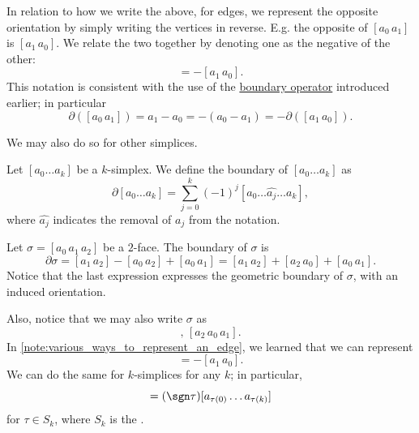 \documentclass[notoc,notitlepage]{tufte-book}
\begin{document}
\begin{note}\label{note:various_ways_to_represent_an_edge}
  In relation to how we write the above, for edges, we represent the opposite
  orientation by simply writing the vertices in reverse. E.g. the opposite of
  $[a_0 \, a_1]$ is $[a_1 \, a_0]$. We relate the two together by denoting one as
  the negative of the other:
  \begin{equation*}
    [a_0 \, a_1] = - [a_1 \, a_0].
  \end{equation*}
  This notation is consistent with the use of the
  \hyperref[defn:boundary_of_an_edge]{boundary operator} introduced earlier; in
  particular
  \begin{equation*}
    \partial ([a_0 \, a_1]) = a_1 - a_0 = - (a_0 - a_1) = - \partial ([a_1 \,
    a_0]).
  \end{equation*}
\end{note}

We may also do so for other simplices.

\begin{defn}\label{defn:boundary_of_simplicies}
  Let $[a_0 \hdots a_k]$ be a $k$-simplex. We define the boundary of $[a_0
  \hdots a_k]$ as
  \begin{equation*}
    \partial[a_0 \hdots a_k] = \sum_{j=0}^{k} (-1)^j [a_0 \hdots \hat{a_j}
    \hdots a_k],
  \end{equation*}
  where $\hat{a_j}$ indicates the removal of $a_j$ from the notation.
\end{defn}

\begin{eg}
  Let $\sigma = [a_0 \, a_1 \, a_2]$ be a $2$-face. The boundary of $\sigma$ is
  \begin{equation*}
    \partial \sigma = [a_1 \, a_2] - [a_0 \, a_2] + [a_0 \, a_1]
    = [a_1 \, a_2] + [a_2 \, a_0] + [a_0 \, a_1].
  \end{equation*}
  Notice that the last expression expresses the geometric boundary of $\sigma$,
  with an induced orientation.

  Also, notice that we may also write $\sigma$ as
  \begin{equation*}
    [a_1 \, a_2 \, a_0], \, [a_2 \, a_0 \, a_1].
  \end{equation*}
  In \cref{note:various_ways_to_represent_an_edge}, we learned that we can
  represent
  \begin{equation*}
    [a_0 \, a_1] = - [a_1 \, a_0].
  \end{equation*}
  We can do the same for $k$-simplices for any $k$; in particular,
  \begin{equation*}
    [a_0 \, \hdots \, a_k] = (\sgn \tau) [a_{\tau(0)} \hdots a_{\tau(k)}]
  \end{equation*}
  for $\tau \in S_k$, where $S_k$ is the .
\end{eg}
\end{document}

